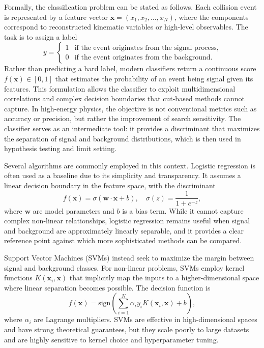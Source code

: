Formally, the classification problem can be stated as follows. Each collision event is represented by a feature vector $\mathbf{x} = (x_1, x_2, \ldots, x_N)$, where the components correspond to reconstructed kinematic variables or high-level observables. The task is to assign a label
\begin{equation}
y =
\begin{cases}
1 & \text{if the event originates from the signal process}, \\
0 & \text{if the event originates from the background}.
\end{cases}
\end{equation}
Rather than predicting a hard label, modern classifiers return a continuous score $f(\mathbf{x}) \in [0,1]$ that estimates the probability of an event being signal given its features. This formulation allows the classifier to exploit multidimensional correlations and complex decision boundaries that cut-based methods cannot capture. In high-energy physics, the objective is not conventional metrics such as accuracy or precision, but rather the improvement of search sensitivity. The classifier serves as an intermediate tool: it provides a discriminant that maximizes the separation of signal and background distributions, which is then used in hypothesis testing and limit setting.

Several algorithms are commonly employed in this context. Logistic regression is often used as a baseline due to its simplicity and transparency. It assumes a linear decision boundary in the feature space, with the discriminant
\begin{equation}
f(\mathbf{x}) = \sigma(\mathbf{w} \cdot \mathbf{x} + b), \quad 
\sigma(z) = \frac{1}{1 + e^{-z}},
\end{equation}
where $\mathbf{w}$ are model parameters and $b$ is a bias term. While it cannot capture complex non-linear relationships, logistic regression remains useful when signal and background are approximately linearly separable, and it provides a clear reference point against which more sophisticated methods can be compared.

Support Vector Machines (SVMs) instead seek to maximize the margin between signal and background classes. For non-linear problems, SVMs employ kernel functions $K(\mathbf{x}_i, \mathbf{x})$ that implicitly map the inputs to a higher-dimensional space where linear separation becomes possible. The decision function is
\begin{equation}
f(\mathbf{x}) = \text{sign}\left(\sum_{i=1}^{N} \alpha_i y_i K(\mathbf{x}_i, \mathbf{x}) + b\right),
\end{equation}
where $\alpha_i$ are Lagrange multipliers. SVMs are effective in high-dimensional spaces and have strong theoretical guarantees, but they scale poorly to large datasets and are highly sensitive to kernel choice and hyperparameter tuning.

